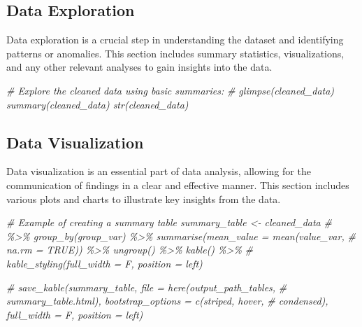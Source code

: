 \documentclass[
  12pt,
]{article}
\newenvironment{Shaded}{\begin{snugshade}}{\end{snugshade}}
\newcommand{\CommentTok}[1]{\textcolor[rgb]{0.56,0.35,0.01}{\textit{#1}}}
\begin{document}
\subsection{Data Exploration}\label{data-exploration}

Data exploration is a crucial step in understanding the dataset and
identifying patterns or anomalies. This section includes summary
statistics, visualizations, and any other relevant analyses to gain
insights into the data.

\begin{Shaded}
\begin{Highlighting}[]
\CommentTok{\# Explore the cleaned data using basic summaries:}
\CommentTok{\# glimpse(cleaned\_data) summary(cleaned\_data) str(cleaned\_data)}
\end{Highlighting}
\end{Shaded}

\subsection{Data Visualization}\label{data-visualization}

Data visualization is an essential part of data analysis, allowing for
the communication of findings in a clear and effective manner. This
section includes various plots and charts to illustrate key insights
from the data.

\begin{Shaded}
\begin{Highlighting}[]
\CommentTok{\# Example of creating a summary table summary\_table \textless{}{-} cleaned\_data}
\CommentTok{\# \%\textgreater{}\% group\_by(group\_var) \%\textgreater{}\% summarise(mean\_value = mean(value\_var,}
\CommentTok{\# na.rm = TRUE)) \%\textgreater{}\% ungroup() \%\textgreater{}\% kable() \%\textgreater{}\%}
\CommentTok{\# kable\_styling(full\_width = F, position = \textquotesingle{}left\textquotesingle{})}

\CommentTok{\# save\_kable(summary\_table, file = here(output\_path\_tables,}
\CommentTok{\# \textquotesingle{}summary\_table.html\textquotesingle{}), bootstrap\_options = c(\textquotesingle{}striped\textquotesingle{}, \textquotesingle{}hover\textquotesingle{},}
\CommentTok{\# \textquotesingle{}condensed\textquotesingle{}), full\_width = F, position = \textquotesingle{}left\textquotesingle{})}
\end{Highlighting}
\end{Shaded}
\end{document}
